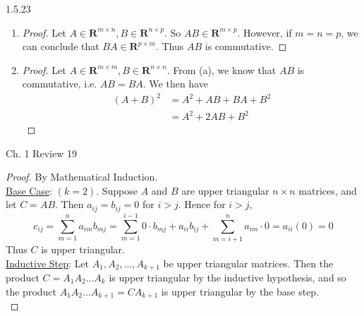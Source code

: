 \documentclass{article}
\theoremstyle{definition}
\begin{document}
	\begin{prob}{1.5.23} $  $ \vspace{1mm}
		\begin{enumerate}[label=(\alph*)]
			\item
				\begin{proof}
					Let $ A \in \mathbf{R}^{m \times n}, B \in \mathbf{R}^{n \times p} $. So $ AB \in \mathbf{R}^{m \times p} $. However, if $ m=n=p $, we can conclude that $ BA \in \mathbf{R}^{p \times m} $. Thus $ AB $ is commutative.
				\end{proof}
			\item 
				\begin{proof}
					Let $ A \in \mathbf{R}^{m \times m}, B \in \mathbf{R}^{n \times n} $. From (a), we know that $ AB $ is commutative, i.e. $ AB = BA $. We then have
						\begin{align*}
							(A+B)^2 &= A^2 + AB + BA + B^2 \\
									&= A^2 + 2AB + B^2
						\end{align*}
				\end{proof}
		\end{enumerate}
	\end{prob}
	
	
	\begin{prob}{Ch. 1 Review 19} $  $ \\
		\begin{proof}
			By Mathematical Induction. \\
			
			\underline{Base Case}: $ (k=2) $. Suppose $ A $ and $ B $ are upper triangular $ n \times n $ matrices, and let $ C = AB $. Then $ a_{ij} = b_{ij} = 0 $ for $ i>j $. Hence for $ i>j $,
			\[
				c_{ij} = \sum\limits_{m=1}^{n} a_{im} b_{mj} = \sum\limits_{m=1}^{i-1} 0 \cdot b_{mj} + a_{ii} b_{ij} + \sum\limits_{m=i+1}^{n} a_{im} \cdot 0 = a_{ii}(0) = 0
			\]
			Thus $ C $ is upper triangular. \\
			
			\underline{Inductive Step}: Let $ A_1, A_2, \dots, A_{k+1} $ be upper triangular matrices. Then the product $ C = A_1 A_2 \dots A_{k} $ is upper triangular by the inductive hypothesis, and so the product $ A_1 A_2 \dots A_{k+1} = CA_{k+1} $ is upper triangular by the base step. \\
		\end{proof}
	\end{prob}
\end{document}

